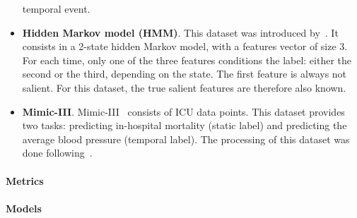 \begin{itemize}
        temporal event.
    \item \textbf{Hidden Markov model (HMM)}.
        This dataset was introduced by~\citep{crabbe2021explaining}.
        It consists in a 2-state hidden Markov model, with a features vector of size 3.
        For each time, only one of the three features conditions the label: either the second or the third, depending
        on the state.
        The first feature is always not salient.
        For this dataset, the true salient features are therefore also known.
    \item \textbf{Mimic-III}.
        Mimic-III~\citep{johnson2016mimic} consists of ICU data points.
        This dataset provides two tasks: predicting in-hospital mortality (static label) and predicting the
        average blood pressure (temporal label).
        The processing of this dataset was done following~\citep{tonekaboni2020went, crabbe2021explaining}.
\end{itemize}

\paragraph{Metrics}

\paragraph{Models}
